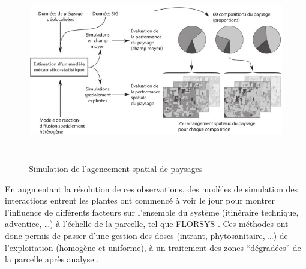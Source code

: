 \documentclass[../thesis.tex]{subfiles}
\begin{document}
    \begin{figure}[H]
        \centering
        \includegraphics[height=8cm]{img/intro/simulation}
        \caption{Simulation de l'agencement spatial de paysages}
        \label{fig:02-simulation}
    \end{figure}
    
    En augmentant la résolution de ces observations, des modèles de simulation des interactions entrent les plantes ont commencé à voir le jour pour montrer l'influence de différents facteurs sur l'ensemble du système (itinéraire technique, adventice, \dots) à l'échelle de la parcelle, tel-que FLORSYS \cite{colbach2021florsys}. Ces méthodes ont donc permis de passer d'une gestion des doses (intrant, phytosanitaire, \dots) de l'exploitation (homogène et uniforme), à un traitement des zones ``dégradées'' de la parcelle après analyse \cite{lherbier2005valorisation}. 
    
    
    
    
    
    
\end{document}
